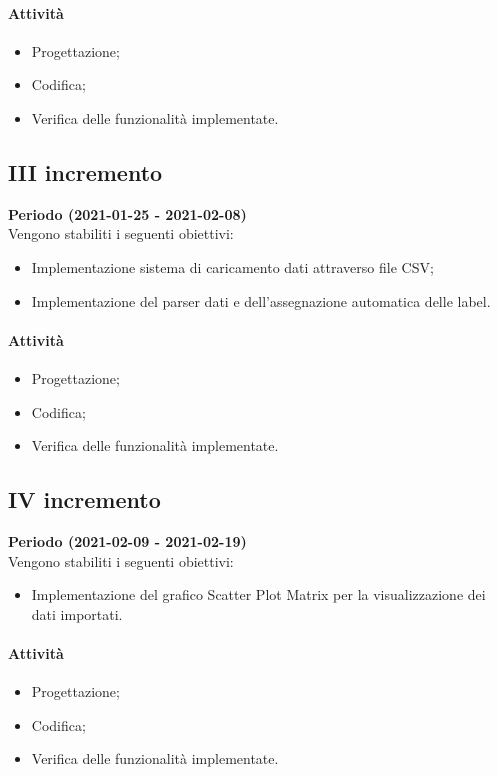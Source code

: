 \documentclass[../piano_di_progetto.tex]{subfiles}
\begin{document}
\paragraph*{Attività}
\begin{itemize}
    \item Progettazione;
    \item Codifica;
    \item Verifica delle funzionalità implementate.
\end{itemize}

\subsection*{III incremento}
\textbf{Periodo (2021-01-25 - 2021-02-08)} \\
Vengono stabiliti i seguenti obiettivi:
\begin{itemize}
    \item Implementazione sistema di caricamento dati attraverso file CSV;
    \item Implementazione del parser dati e dell'assegnazione automatica delle label.
\end{itemize}
\paragraph*{Attività}
\begin{itemize}
    \item Progettazione;
    \item Codifica;
    \item Verifica delle funzionalità implementate.
\end{itemize}

\subsection*{IV incremento}
\textbf{Periodo (2021-02-09 - 2021-02-19)} \\
Vengono stabiliti i seguenti obiettivi:
\begin{itemize}
    \item Implementazione del grafico Scatter Plot Matrix per la visualizzazione dei dati importati.
\end{itemize}
\paragraph*{Attività}
\begin{itemize}
    \item Progettazione;
    \item Codifica;
    \item Verifica delle funzionalità implementate.
\end{itemize}
\end{document}
